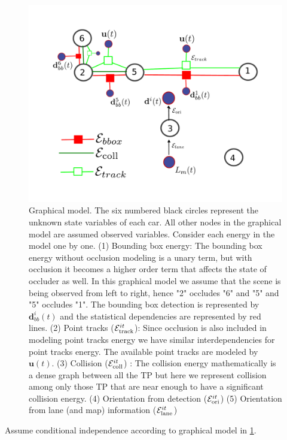 \documentclass[10pt,twocolumn,letterpaper]{article}
\begin{document}
\begin{figure}[t]
  \includegraphics[width=\columnwidth]{graphics/graphicalModelFrom61ConstVars.pdf}
  \caption{Graphical model. The six numbered black circles represent the
    unknown state variables of each car. All other nodes in the graphical model
    are assumed
    observed variables. Consider each energy in the model one by one. (1)
    Bounding box energy: The bounding box energy without occlusion modeling is
    a unary term, but with occlusion it becomes a higher order term that
    affects the state of occluder as well. In this graphical model we assume
    that the scene is being observed from left to right, hence "2" occludes "6"
    and "5" and "5" occludes "1". The bounding box detection is represented by
  $\mathbf{d}_{bb}^i(t)$ and the statistical dependencies are represented by
  red lines. (2) Point tracks ($\mathcal{E}^{it}_{\text{track}}$): Since occlusion is also
  included in modeling point tracks energy we have similar interdependencies
  for point tracks energy. The available point tracks are modeled by
  $\mathbf{u}(t)$. (3) Collision ($\mathcal{E}^{it}_{\text{coll}}$) : The collision energy
  mathematically is a dense graph between all the TP but here we represent
  collision among only those TP that are near enough to have a significant
collision energy. (4) Orientation from detection ($\mathcal{E}^{it}_{\text{ori}}$) (5) Orientation from lane (and map) information ($\mathcal{E}^{it}_{\text{lane}}$)}
  \label{fig:graphmodel}
\end{figure}

Assume conditional independence according to graphical model in
\ref{fig:graphmodel}.
\end{document}
